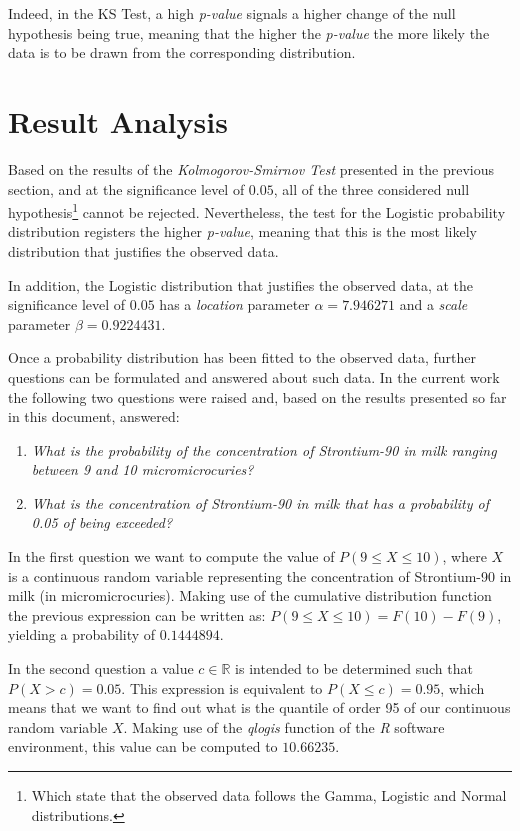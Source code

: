 \documentclass[12pt]{article}
\begin{document}
Indeed, in the KS Test, a high \emph{p-value} signals a higher change of the null hypothesis being true, meaning that the higher the \emph{p-value} the more likely the data is to be drawn from the corresponding distribution.

\section{Result Analysis}
\label{result_analysis}

Based on the results of the \emph{Kolmogorov-Smirnov Test} presented in the previous section, and at the significance level of $0.05$, all of the three considered null hypothesis\footnote{Which state that the observed data follows the Gamma, Logistic and Normal distributions.} cannot be rejected. Nevertheless, the test for the Logistic probability distribution registers the higher \emph{p-value}, meaning that this is the most likely distribution that justifies the observed data.

In addition, the Logistic distribution that justifies the observed data, at the significance level of $0.05$ has a \emph{location} parameter $\alpha=7.946271$ and a \emph{scale} parameter $\beta=0.9224431$.

Once a probability distribution has been fitted to the observed data, further questions can be formulated and answered about such data. In the current work the following two questions were raised and, based on the results presented so far in this document, answered:

\begin{enumerate}
	\item \textsl{What is the probability of the concentration of Strontium-90 in milk ranging between 9 and 10 micromicrocuries?}
	
	\item \textsl{What is the concentration of Strontium-90 in milk that has a probability of 0.05 of being exceeded?}
\end{enumerate}

In the first question we want to compute the value of $P(9 \leq X \leq 10)$, where $X$ is a continuous random variable representing the concentration of Strontium-90 in milk (in micromicrocuries). Making use of the cumulative distribution function the previous expression can be written as: $P(9 \leq X \leq 10) = F(10) - F(9)$, yielding a probability of $0.1444894$.

In the second question a value $c \in \mathbb{R}$ is intended to be determined such that $P(X > c) = 0.05$. This expression is equivalent to $P(X \leq c) = 0.95$, which means that we want to find out what is the quantile of order 95 of our continuous random variable $X$. Making use of the \emph{qlogis} function of the \emph{R} software environment, this value can be computed to $10.66235$.
\end{document}
